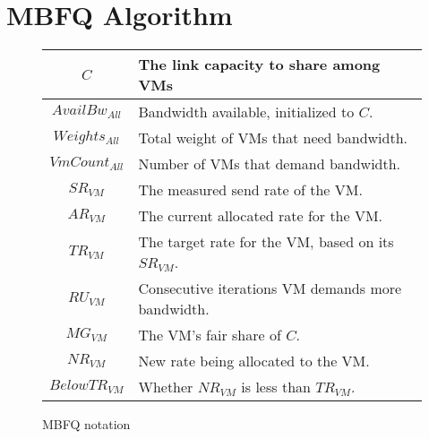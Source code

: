 \section{MBFQ Algorithm}
\label{sec:algorithm}

\begin{figure}[t]
{\footnotesize
\begin{tabular}{ | c | p{6cm} | }
  \hline
  $C$ & The link capacity to share among VMs \\ \hline
  $AvailBw_{All}$ & Bandwidth available, initialized to $C$. \\ \hline
  $Weights_{All}$ & Total weight of VMs that need bandwidth. \\ \hline
  $VmCount_{All}$ & Number of VMs that demand bandwidth. \\ \hline 
  $SR_{VM}$ & The measured send rate of the VM. \\ \hline
  $AR_{VM}$ & The current allocated rate for the VM. \\ \hline
  $TR_{VM}$ & The target rate for the VM, based on its $SR_{VM}$. \\ \hline
  $RU_{VM}$ & Consecutive iterations VM demands more bandwidth. \\ \hline
  $MG_{VM} $ & The VM's fair share of $C$. \\ \hline
  $NR_{VM}$ & New rate being allocated to the VM.   \\ \hline
  $BelowTR_{VM}$ & Whether $NR_{VM}$ is less than $TR_{VM}$. \\ \hline
\end{tabular}
}
\caption{MBFQ notation}
\label{fig:mbfq_init}
\end{figure}

